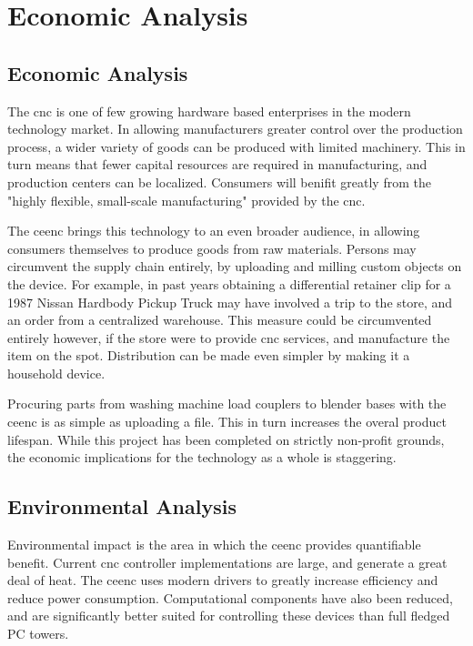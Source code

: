 \chapter{Economic Analysis}
\section{Economic Analysis}
The \gls{cnc} is one of few growing hardware based enterprises in the modern technology market.
In allowing manufacturers greater control over the production process, a wider variety of goods can be produced with limited machinery.
This in turn means that fewer capital resources are required in manufacturing, and production centers can be localized.
Consumers will benifit greatly from the "highly flexible, small-scale manufacturing" provided by the \gls{cnc}.

The \gls{ceenc} brings this technology to an even broader audience, in allowing consumers themselves to produce goods from raw materials.
Persons may circumvent the supply chain entirely, by uploading and milling custom objects on the device.
For example, in past years obtaining a differential retainer clip for a 1987 Nissan Hardbody Pickup Truck may have involved a trip to the store, and an order from a centralized warehouse.
This measure could be circumvented entirely however, if the store were to provide \gls{cnc} services, and manufacture the item on the spot. 
Distribution can be made even simpler by making it a household device.

Procuring parts from washing machine load couplers to blender bases with the \gls{ceenc} is as simple as uploading a file.
This in turn increases the overal product lifespan.
While this project has been completed on strictly non-profit grounds, the economic implications for the technology as a whole is staggering.

\section{Environmental Analysis}
Environmental impact is the area in which the \gls{ceenc} provides quantifiable benefit. 
Current \gls{cnc} controller implementations are large, and generate a great deal of heat. 
The \gls{ceenc} uses modern drivers to greatly increase efficiency and reduce power consumption. 
Computational components have also been reduced, and are significantly better suited for controlling these devices than full fledged PC towers. 

